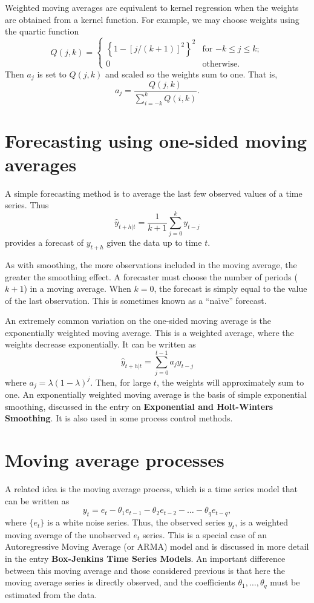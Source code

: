 \documentclass[a4paper,10pt]{article}
\begin{document}
Weighted moving averages are equivalent to kernel regression when the weights are obtained from a kernel function. For example, we may choose weights using the quartic function
\[
	Q(j,k) = \left\{\begin{array}{ll}
		\left\{1 - [j/(k+1)]^2\right\}^2 & \text{for $-k \le j \le k$}; \\
		0                                & \text{otherwise.}
	\end{array}\right.
\]
Then $a_j$ is set to $Q(j,k)$ and scaled so the weights sum to one. That is,
\begin{equation}
	a_j = \frac{Q(j,k)}{\displaystyle\sum_{i=-k}^k Q(i,k)}.
	\label{eq:qweights}
\end{equation}

\section{Forecasting using one-sided moving averages}
\label{sec:ma}

A simple forecasting method is to average the last few observed values of a time series. Thus
\[
	\hat{y}_{t+h|t} = \frac{1}{k+1}\sum_{j=0}^{k} y_{t-j}
\]
provides a forecast of $y_{t+h}$ given the data up to time $t$.

As with smoothing, the more observations included in the moving average, the greater the smoothing effect. A forecaster must choose the number of periods ($k+1$) in a moving average. When $k=0$, the forecast is simply equal to the value of the last observation. This is sometimes known as a ``na\"{\i}ve'' forecast.

An extremely common variation on the one-sided moving average is the exponentially weighted moving average. This is a weighted average, where the weights decrease exponentially. It can be written as
\[
	\hat{y}_{t+h|t} = \sum_{j=0}^{t-1} a_jy_{t-j}
\]
where $a_j = \lambda(1-\lambda)^j$. Then, for large $t$, the weights will approximately sum to one. An exponentially weighted moving average is the basis of simple exponential smoothing, discussed in the entry on \textbf{Exponential and Holt-Winters Smoothing}. It is also used in some process control methods.

\section{Moving average processes}

A related idea is the moving average process, which is a time series model that can be written as
\[
	y_t = e_t - \theta_1 e_{t-1} - \theta_2 e_{t-2} - \dots - \theta_q e_{t-q},
\]
where $\{e_t\}$ is a white noise series. Thus, the observed series $y_t$, is a weighted moving average of the unobserved $e_t$ series. This is a special case of an Autoregressive Moving Average (or ARMA) model and is discussed in more detail in the entry \textbf{Box-Jenkins Time Series Models}. An important difference between this moving average and those considered previous is that here the moving average series is directly observed, and the coefficients $\theta_1,\dots,\theta_q$ must be estimated from the data.

\nocite{Mills2021}


\end{document}
